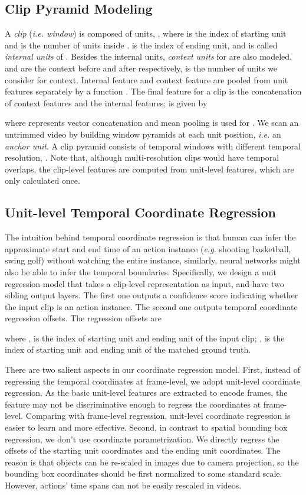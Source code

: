 \documentclass[10pt,twocolumn,letterpaper]{article}
\begin{document}
\subsection{Clip Pyramid Modeling}
A \emph{clip} (\emph{i.e. window})  is composed of units, , where  is the index of starting unit and  is the number of units inside .  is the index of ending unit, and  is called \emph{internal units} of . Besides the internal units, \emph{context units} for  are also modeled.  and   are the context before and after  respectively,  is the number of units we consider for context. Internal feature and context feature are pooled from unit features separately by a function . The final feature  for a clip is the concatenation of context features and the internal features;  is given by

where  represents vector concatenation and mean pooling is used for . We scan an untrimmed video by building window pyramids at each unit position, \emph{i.e.} an \emph{anchor unit}. A clip pyramid  consists of temporal windows with different temporal resolution, . Note that, although multi-resolution clips would have temporal overlaps, the clip-level features are computed from unit-level features, which are only calculated once. 

\subsection{Unit-level Temporal Coordinate Regression}
The intuition behind temporal coordinate regression is that human can infer the approximate start and end time of an action instance (\emph{e.g.} shooting basketball, swing golf) without watching the entire instance, similarly, neural networks might also be able to infer the temporal boundaries. Specifically, we design a unit regression model that takes a clip-level representation  as input, and have two sibling output layers. The first one outputs a confidence score indicating whether the input clip is an action instance. The second one outputs temporal coordinate regression offsets. The regression offsets are

where ,  is the index of starting unit and ending unit of the input clip; ,  is the index of starting unit and ending unit of the matched ground truth.

There are two salient aspects in our coordinate regression model. First, instead of regressing the temporal coordinates at frame-level, we adopt unit-level coordinate regression. As the basic unit-level features are extracted to encode  frames, the feature may not be discriminative enough to regress the coordinates at frame-level. Comparing with frame-level regression, unit-level coordinate regression is easier to learn and more effective. Second, in contrast to spatial bounding box regression,  we don't use coordinate parametrization. We directly regress the offsets of the starting unit coordinates and the ending unit coordinates. The reason is that objects can be re-scaled in images due to camera projection, so the bounding box coordinates should be first normalized to some standard scale. However, actions' time spans can not be easily rescaled in videos.
\end{document}

